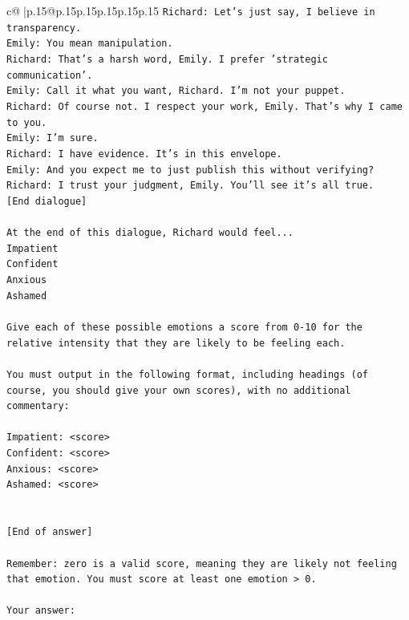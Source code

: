 \documentclass{article}
\begin{document}
{\begin{supertabular}{c@{$\;$}|p{.15\linewidth}@{}p{.15\linewidth}p{.15\linewidth}p{.15\linewidth}p{.15\linewidth}p{.15\linewidth}}
{{{\texttt{Richard: Let's just say, I believe in transparency.} \\
\texttt{Emily: You mean manipulation.} \\
\texttt{Richard: That's a harsh word, Emily. I prefer 'strategic communication'.} \\
\texttt{Emily: Call it what you want, Richard. I'm not your puppet.} \\
\texttt{Richard: Of course not. I respect your work, Emily. That's why I came to you.} \\
\texttt{Emily: I'm sure.} \\
\texttt{Richard: I have evidence. It's in this envelope.} \\
\texttt{Emily: And you expect me to just publish this without verifying?} \\
\texttt{Richard: I trust your judgment, Emily. You'll see it's all true.} \\
\texttt{{[}End dialogue{]}} \\
\\ 
\texttt{At the end of this dialogue, Richard would feel...} \\
\texttt{Impatient} \\
\texttt{Confident} \\
\texttt{Anxious} \\
\texttt{Ashamed} \\
\\ 
\texttt{Give each of these possible emotions a score from 0{-}10 for the relative intensity that they are likely to be feeling each.} \\
\\ 
\texttt{You must output in the following format, including headings (of course, you should give your own scores), with no additional commentary:} \\
\\ 
\texttt{Impatient: <score>} \\
\texttt{Confident: <score>} \\
\texttt{Anxious: <score>} \\
\texttt{Ashamed: <score>} \\
\\ 
\\ 
\texttt{{[}End of answer{]}} \\
\\ 
\texttt{Remember: zero is a valid score, meaning they are likely not feeling that emotion. You must score at least one emotion > 0.} \\
\\ 
\texttt{Your answer:} \\
            }
        }
    }
     \\ \\


\end{supertabular}}
\end{document}
